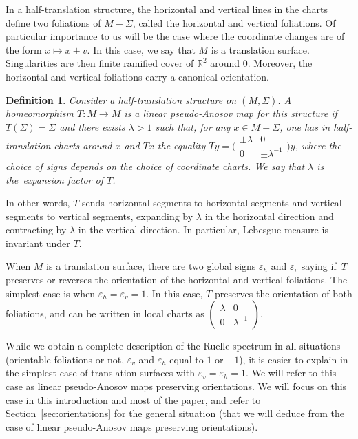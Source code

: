 \documentclass[10pt]{amsart}
\newcommand{\R}{\mathbb{R}}
\let\epsilon\varepsilon
\newtheorem{definition}[thm]{Definition}
\theoremstyle{definition}
\numberwithin{equation}{section}
\begin{document}
In a half-translation structure, the horizontal and vertical lines in the
charts define two foliations of $M-\Sigma$, called the horizontal and
vertical foliations. Of particular importance to us will be the case where
the coordinate changes are of the form $x \mapsto x + v$. In this case, we
say that $M$ is a translation surface. Singularities are then finite ramified
cover of $\R^2$ around $0$. Moreover, the horizontal and vertical foliations
carry a canonical orientation.

\begin{definition}
Consider a half-translation structure on $(M,\Sigma)$. A homeomorphism
$T:M\to M$ is a linear pseudo-Anosov map for this structure if
$T(\Sigma)=\Sigma$ and there exists $\lambda>1$ such that, for any $x \in
M-\Sigma$, one has in half-translation charts around $x$ and $Tx$ the
equality $T y = \bigl(\begin{smallmatrix} \pm \lambda & 0 \\ 0 & \pm
\lambda^{-1}
\end{smallmatrix}\bigr)y$, where the choice of signs depends on the
choice of coordinate charts. We say that $\lambda$ is the~\emph{expansion
factor} of $T$.
\end{definition}
In other words, $T$ sends horizontal segments to horizontal segments and
vertical segments to vertical segments, expanding by $\lambda$ in the
horizontal direction and contracting by $\lambda$ in the vertical direction.
In particular, Lebesgue measure is invariant under $T$.

When $M$ is a translation surface, there are two global signs $\epsilon_h$
and $\epsilon_v$ saying if~$T$ preserves or reverses the orientation of the
horizontal and vertical foliations. The simplest case is when $\epsilon_h =
\epsilon_v = 1$. In this case, $T$ preserves the orientation of both
foliations, and can be written in local charts as $\left(\begin{smallmatrix}
\lambda & 0 \\ 0 & \lambda^{-1}
\end{smallmatrix}\right)$.

While we obtain a complete description of the Ruelle spectrum in all
situations (orientable foliations or not, $\epsilon_v$ and $\epsilon_h$ equal
to $1$ or $-1$), it is easier to explain in the simplest case of translation
surfaces with $\epsilon_v = \epsilon_h = 1$. We will refer to this case as
linear pseudo-Anosov maps preserving orientations. We will focus on this case
in this introduction and most of the paper, and refer to
Section~\ref{sec:orientations} for the general situation (that we will deduce from the
case of linear pseudo-Anosov maps preserving orientations).
\end{document}
